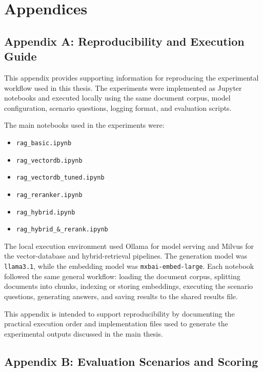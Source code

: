 \chapter*{Appendices}

\section*{Appendix A: Reproducibility and Execution Guide}

This appendix provides supporting information for reproducing the experimental workflow used in this thesis. The experiments were implemented as Jupyter notebooks and executed locally using the same document corpus, model configuration, scenario questions, logging format, and evaluation scripts.

The main notebooks used in the experiments were:
\begin{itemize}
    \item \texttt{rag\_basic.ipynb}
    \item \texttt{rag\_vectordb.ipynb}
    \item \texttt{rag\_vectordb\_tuned.ipynb}
    \item \texttt{rag\_reranker.ipynb}
    \item \texttt{rag\_hybrid.ipynb}
    \item \texttt{rag\_hybrid\_\&\_rerank.ipynb}
\end{itemize}

The local execution environment used Ollama for model serving and Milvus for the vector-database and hybrid-retrieval pipelines. The generation model was \texttt{llama3.1}, while the embedding model was \texttt{mxbai-embed-large}. Each notebook followed the same general workflow: loading the document corpus, splitting documents into chunks, indexing or storing embeddings, executing the scenario questions, generating answers, and saving results to the shared results file.

This appendix is intended to support reproducibility by documenting the practical execution order and implementation files used to generate the experimental outputs discussed in the main thesis.

\newpage
\section*{Appendix B: Evaluation Scenarios and Scoring}

